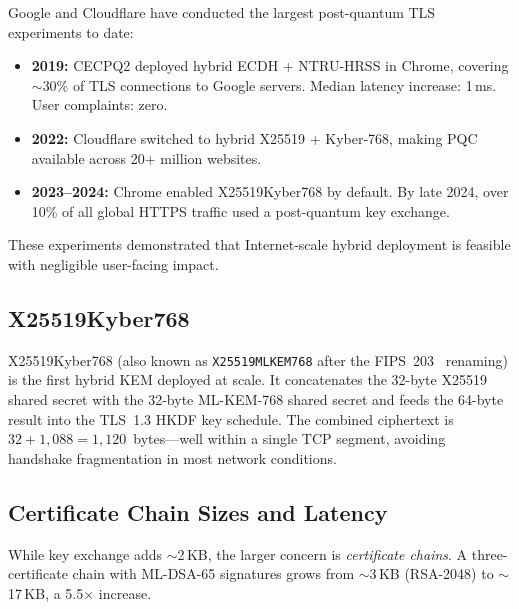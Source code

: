 \begin{example}
\label{ex:cecpq2}
Google and Cloudflare have conducted the largest post-quantum TLS experiments to date:
\begin{itemize}
\item \textbf{2019:} CECPQ2 deployed hybrid ECDH + NTRU-HRSS in Chrome, covering $\sim$30\% of TLS connections to Google servers.  Median latency increase: 1\,ms.  User complaints: zero.
\item \textbf{2022:} Cloudflare switched to hybrid X25519 + Kyber-768, making PQC available across 20+ million websites.
\item \textbf{2023--2024:} Chrome enabled X25519Kyber768 by default.  By late 2024, over 10\% of all global HTTPS traffic used a post-quantum key exchange.
\end{itemize}
These experiments demonstrated that Internet-scale hybrid deployment is feasible with negligible user-facing impact.
\end{example}

\subsection{X25519Kyber768}
\label{subsec:x25519kyber768}

X25519Kyber768 (also known as \texttt{X25519MLKEM768} after the FIPS~203~\cite{FIPS203} renaming) is the first hybrid KEM deployed at scale.  It concatenates the 32-byte X25519 shared secret with the 32-byte ML-KEM-768 shared secret and feeds the 64-byte result into the TLS~1.3 HKDF key schedule.  The combined ciphertext is $32 + 1{,}088 = 1{,}120$~bytes---well within a single TCP segment, avoiding handshake fragmentation in most network conditions.


\subsection{Certificate Chain Sizes and Latency}
\label{subsec:cert-chain-sizes}

While key exchange adds $\sim$2\,KB, the larger concern is \emph{certificate chains}.  A three-certificate chain with ML-DSA-65 signatures grows from $\sim$3\,KB (RSA-2048) to $\sim$17\,KB, a 5.5$\times$ increase.

